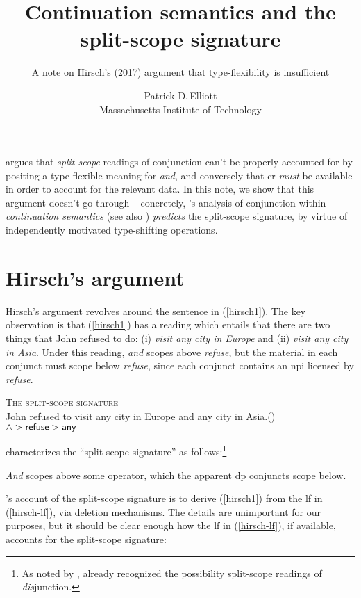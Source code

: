 \documentclass[cronos]{ling-paper}
\title{Continuation semantics and the split-scope signature}
\subtitle{A note on Hirsch's (2017) argument that type-flexibility is insufficient}
\author{Patrick D.\,Elliott\\Massachusetts Institute of Technology}
\begin{document}
\maketitle

\citet{hirschThesis} argues that \textit{split scope} readings of conjunction
can't be properly accounted for by positing a type-flexible meaning for
\textit{and}, and conversely that \ac{cr} \textit{must} be available in order to
account for the relevant data. In this note, we show that this argument doesn't
go through -- concretely, \citeauthor{barker2002}'s analysis of conjunction
within \textit{continuation semantics} (see also \citealt[chapter
7]{barkerShan2015}) \textit{predicts} the split-scope signature, by virtue of
independently motivated type-shifting operations.

\section{Hirsch's argument}

Hirsch's argument revolves around the sentence in (\ref{hirsch1}). The key
observation is that (\ref{hirsch1}) has a reading which entails that there are
two things that John refused to do: (i) \textit{visit any city in Europe} and
(ii) \textit{visit any city in Asia}. Under this reading, \textit{and} scopes
above \textit{refuse}, but the material in each conjunct must scope below
\textit{refuse}, since each conjunct contains an \ac{npi} licensed by \textit{refuse}.

\ex \textsc{The split-scope signature}\\
John refused to visit any city in Europe and any city in
Asia.\label{hirsch1}\hfill(\citealt[p.\,90]{hirschThesis})\\
\phantom{,}\hfill $\wedge > \textsf{refuse} > \textsf{any}$
\xe

\citeauthor{hirschThesis} characterizes the \enquote{split-scope signature} as
follows:\footnote{As noted by \citeauthor{hirschThesis}, \citet{parteeRooth}
  already recognized the possibility split-scope readings of \textit{dis}junction.}

\ex
\textit{And} scopes above some operator, which the apparent \ac{dp} conjuncts
scope below.
\xe

\citeauthor{hirschThesis}'s account of the split-scope signature is to derive
(\ref{hirsch1}) from the \ac{lf} in (\ref{hirsch-lf}), via deletion mechanisms.
The details are unimportant for our purposes, but it should be clear enough how
the \ac{lf} in (\ref{hirsch-lf}), if available, accounts for the split-scope signature:
\end{document}
